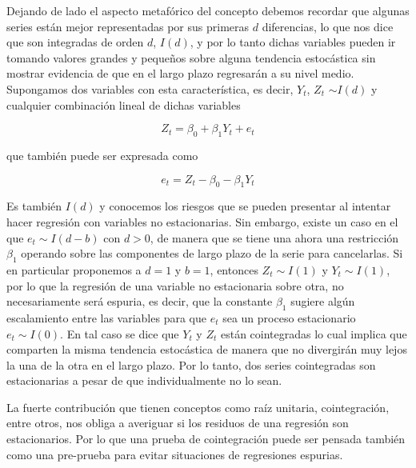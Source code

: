 Dejando de lado el aspecto metafórico del concepto debemos recordar que algunas series  están mejor representadas por sus primeras  $d$ diferencias, lo que nos dice que son integradas de orden $d$, $I(d)$, y por lo tanto dichas variables pueden ir tomando valores grandes y peque\~nos sobre alguna tendencia estocástica sin mostrar evidencia de que en el largo plazo  regresarán a su nivel medio. Supongamos dos variables con esta característica, es decir,  $Y_t$, $Z_t$ $\sim I(d)$ y cualquier combinación lineal de dichas variables

\begin{equation}\label{eq:cap3_1}
Z_t=\beta_0+\beta_1Y_t+ e_t 
\end{equation}


que también puede ser expresada como 

\begin{equation}
e_t=Z_t-\beta_0-\beta_1Y_t \label{eq:cap3_2}
\end{equation}



Es también $I(d)$ y conocemos los riesgos que se pueden presentar al intentar hacer regresión con variables no estacionarias. Sin embargo, existe  un caso en el que $e_t \sim I(d-b)$ con $d>0$, de manera que se tiene una ahora una restricción $\beta_1$ operando sobre las componentes de largo plazo de la serie para cancelarlas. Si en particular proponemos a $d=1$ y $b=1$, entonces $Z_t \sim I(1)$ y $Y_t \sim I(1)$, por lo que la regresión de una variable no estacionaria sobre otra, no necesariamente será espuria, es decir, que la constante $\beta_1$ sugiere algún escalamiento entre las variables para que $e_t$ sea un proceso estacionario $e_t \sim I(0)$. En tal caso se dice que $Y_t$ y $Z_t$ están cointegradas lo cual implica que comparten la misma tendencia estocástica de manera que no divergirán muy lejos la una de la otra en el largo plazo. Por lo tanto, dos series cointegradas son estacionarias a pesar de que individualmente no lo sean.\bigskip

La fuerte contribución que tienen conceptos como raíz unitaria, cointegración, entre otros, nos obliga a averiguar si los residuos de una regresión son estacionarios. Por lo que una prueba de cointegración puede ser pensada también como una pre-prueba para evitar situaciones de regresiones espurias.\bigskip


